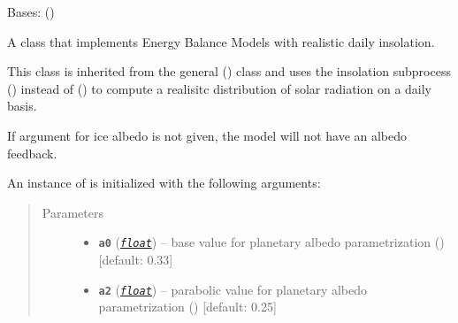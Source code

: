 \documentclass[a4paper,10pt,english]{sphinxmanual}
\begin{document}
\begin{fulllineitems}
\label{api/climlab.model:climlab.model.ebm.EBM_seasonal}
Bases: {\hyperref[api/climlab.model:climlab.model.ebm.EBM]{\emph{}}} ()

A class that implements Energy Balance Models with realistic 
daily insolation.

This class is inherited from the general {\hyperref[api/climlab.model:climlab.model.ebm.EBM]{\emph{}}} ()
class and uses the insolation subprocess 
{\hyperref[api/climlab.radiation:climlab.radiation.insolation.DailyInsolation]{\emph{}}} () instead of 
{\hyperref[api/climlab.radiation:climlab.radiation.insolation.P2Insolation]{\emph{}}} () to compute a
realisitc distribution of solar radiation on a daily basis.

If argument for ice albedo  is not given, the model will not 
have an albedo feedback.

An instance of  is initialized with the following 
arguments:
\begin{quote}\begin{description}
\item[{Parameters}] \leavevmode\begin{itemize}
\item {} 
\textbf{\texttt{a0}} (\href{http://docs.python.org/2.7/library/functions.html\#float}{\emph{\texttt{float}}}) -- base value for planetary albedo parametrization
{\hyperref[api/climlab.surface:climlab.surface.albedo.StepFunctionAlbedo]{\emph{}}} ()
{[}default: 0.33{]}

\item {} 
\textbf{\texttt{a2}} (\href{http://docs.python.org/2.7/library/functions.html\#float}{\emph{\texttt{float}}}) -- parabolic value for planetary  albedo parametrization
{\hyperref[api/climlab.surface:climlab.surface.albedo.StepFunctionAlbedo]{\emph{}}} ()
{[}default: 0.25{]}


\end{itemize}
\end{description}
\end{quote}
\end{fulllineitems}
\end{document}
